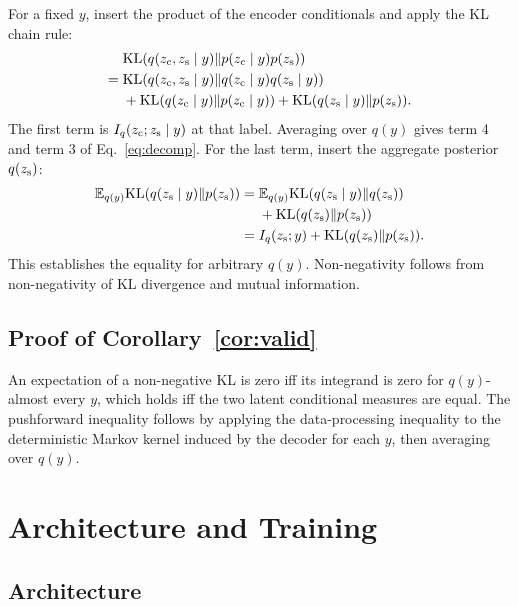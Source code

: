For a fixed $y$, insert the product of the encoder conditionals and apply the
KL chain rule:
\begin{align}
&\mathrm{KL}\!\left(q(z_{\mathrm{c}},z_{\mathrm{s}}\mid y)\|p(z_{\mathrm{c}}\mid y)p(z_{\mathrm{s}})\right)\\
={}&\mathrm{KL}\!\left(q(z_{\mathrm{c}},z_{\mathrm{s}}\mid y)\|q(z_{\mathrm{c}}\mid y)q(z_{\mathrm{s}}\mid y)\right)\nonumber\\
&+\mathrm{KL}(q(z_{\mathrm{c}}\mid y)\|p(z_{\mathrm{c}}\mid y))
+\mathrm{KL}(q(z_{\mathrm{s}}\mid y)\|p(z_{\mathrm{s}})).
\end{align}
The first term is $I_q(z_{\mathrm{c}};z_{\mathrm{s}}\mid y)$ at that label.  Averaging over
$q(y)$ gives term 4 and term 3 of Eq.~\ref{eq:decomp}.  For the last term,
insert the aggregate posterior $q(z_{\mathrm{s}})$:
\begin{align}
\mathbb E_{q(y)}\mathrm{KL}(q(z_{\mathrm{s}}\mid y)\|p(z_{\mathrm{s}}))
={}&\mathbb E_{q(y)}\mathrm{KL}(q(z_{\mathrm{s}}\mid y)\|q(z_{\mathrm{s}}))\nonumber\\
&+\mathrm{KL}(q(z_{\mathrm{s}})\|p(z_{\mathrm{s}}))\\
={}&I_q(z_{\mathrm{s}};y)+\mathrm{KL}(q(z_{\mathrm{s}})\|p(z_{\mathrm{s}})).
\end{align}
This establishes the equality for arbitrary $q(y)$.  Non-negativity follows
from non-negativity of KL divergence and mutual information.

\subsection{Proof of Corollary~\ref{cor:valid}}

An expectation of a non-negative KL is zero iff its integrand is zero for
$q(y)$-almost every $y$, which holds iff the two latent conditional measures
are equal.  The pushforward inequality follows by applying the data-processing
inequality to the deterministic Markov kernel induced by the decoder for each
$y$, then averaging over $q(y)$.

\section{Architecture and Training}
\label{app:model}

\subsection{Architecture}


